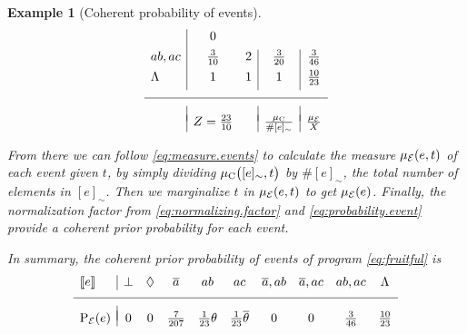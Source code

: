 \documentclass{tlp}
\newtheorem{example}{Example}
\newcommand{\at}[1]{\ensuremath{\!\del{#1}}}        %
\newcommand{\cla}[1]{\ensuremath{{\cal #1}}}        %
\newcommand{\co}[1]{\ensuremath{\overline{#1}}}     %
\newcommand{\EVENTSset}{\ensuremath{\cla{E}}}
\newcommand{\prfunc}{\ensuremath{\mathrm{P}}}
\newcommand{\prd}[1]{\ensuremath{\prfunc_{#1}}}
\newcommand{\prE}{\prd{\EVENTSset}}
\newcommand{\pwC}{\ensuremath{\mu_{\textrm{C}}}}
\newcommand{\pwc}[1]{\ensuremath{\pwC\at{#1}}}
\newcommand{\pwE}{\ensuremath{\mu_{\EVENTSset}}}
\newcommand{\pwe}[1]{\ensuremath{\pwE\at{#1}}}
\newcommand{\stablecore}[1]{\ensuremath{\left\llbracket #1 \right\rrbracket}}
\newcommand{\inconsistent}{\bot}
\newcommand{\bottomclass}{\ensuremath{\Lambda}}
\newcommand{\indepclass}{\ensuremath{\Diamond}}
\newcommand{\class}[1]{\ensuremath{[{#1}]_{\sim}}}
\begin{document}
{\begin{example}[Coherent probability of events]
\begin{equation*}
\begin{array}{l|cc|c|c}
                & 0
            \\[4pt]
            ab, ac
                & \frac{3}{10}
                & 2
                & \frac{3}{20}
                & \frac{3}{46}
            \\[4pt]
            \bottomclass
                & 1
                & 1
                & 1
                & \frac{10}{23}
            \\[4pt]
            \hline
            &&&&
            \\[-0.5em]
                & Z = \frac{23}{10}
                &
                & \frac{\pwC}{\#\class{e}}
                & \frac{\pwE}{X}
        \end{array}
    \end{equation*}

    
    From there we can follow \cref{eq:measure.events} to calculate the
    measure \(\pwe{e, t}\) of each event given \(t\), by simply
    dividing \(\pwc{\class{e}, t}\) by \(\#\class{e}\), the total
    number of elements in \(\class{e}\).  Then we marginalize \(t\) in
    \(\pwe{e, t}\) to get \(\pwe{e}\).  Finally, the normalization
    factor from \cref{eq:normalizing.factor} and
    \cref{eq:probability.event} provide a coherent \emph{prior}
    probability for each event.

    In summary, the coherent \emph{prior} probability of events of
    program \cref{eq:fruitful} is
    \begin{equation}
        \begin{array}{l|ccccccccc}
            \stablecore{e}          &
            \inconsistent           &
            \indepclass             &
            \co{a}                  &
            ab                      &
            ac                      &
            \co{a}, ab              &
            \co{a}, ac              &
            ab, ac                  &
            \bottomclass              \\ 
            
            \hline\\[-8pt]

            \prE\at{e}              &
            0                       &
            0                       &
            \frac{7}{207}           &
            \frac{1}{23}\theta      &
            \frac{1}{23}\co{\theta} &
            0                       &
            0                       &
            \frac{3}{46}            &
            \frac{10}{23}
        \end{array}
    \end{equation}\label{eq:sbf.prior}
\end{example}
}
\end{document}
